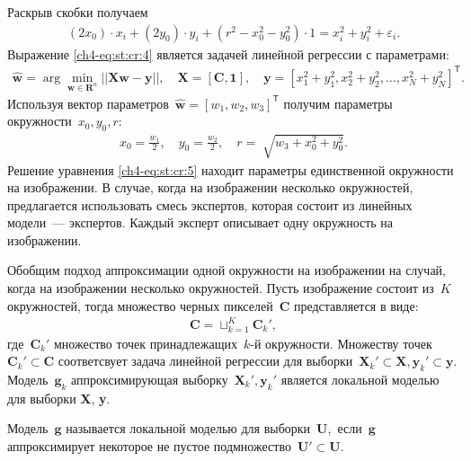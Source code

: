 Раскрыв скобки получаем
\[
\label{ch4-eq:st:cr:4}
\begin{aligned}
\left(2x_0\right)\cdot x_i + \left(2y_0\right)\cdot y_i+\left(r^2-x_0^2-y_0^2\right)\cdot1 = x_{i}^2 + y_{i}^2 + \varepsilon_i.
\end{aligned}
\]
Выражение \eqref{ch4-eq:st:cr:4} является задачей линейной регрессии с параметрами:
\[
\label{ch4-eq:st:cr:5}
\begin{aligned}
\hat{\textbf{w}} = \arg\min_{\textbf{w}\in \mathbf{R}^{n}}||\textbf{X}\textbf{w} - \textbf{y}||,  \quad \textbf{X} = \left[\textbf{C}, \textbf{1}\right], \quad \textbf{y} = \left[x_1^2+y_1^2, x_2^2+y_2^2, \ldots, x_N^2+y_N^2\right]^{\mathsf{T}}.
\end{aligned}
\]
Используя вектор параметров~$\hat{\textbf{w}} = \left[w_1, w_2, w_3\right]^{\mathsf{T}}$ получим параметры окружности~$x_0, y_0, r$:
\[
\label{ch4-eq:st:cr:6}
\begin{aligned}
x_0 = \frac{w_1}{2}, \quad y_0 = \frac{w_2}{2}, \quad r = \sqrt[]{w_3+x_{0}^{2}+y_{0}^{2}}.
\end{aligned}
\]
Решение уравнения \eqref{ch4-eq:st:cr:5} находит параметры единственной окружности на изображении. В случае, когда на изображении несколько окружностей, предлагается использовать смесь экспертов, которая состоит из линейных модели~--- экспертов. Каждый эксперт описывает одну окружность на изображении.

Обобщим подход аппроксимации одной окружности на изображении на случай, когда на изображении несколько окружностей. Пусть изображение состоит из~$K$ окружностей, тогда множество черных пикселей~$\textbf{C}$ представляется в виде:
\[
\label{ch4-eq:st:1}
\begin{aligned}
\textbf{C} = \sqcup_{k=1}^{K}\textbf{C}_{k}',
\end{aligned}
\]
где~$\textbf{C}_{k}'$ множество точек принадлежащих~$k$-й окружности. Множеству точек~$\textbf{C}_{k}' \subset\textbf{C}$ соответсвует задача линейной регрессии для выборки~$\textbf{X}_{k}' \subset \textbf{X}, \textbf{y}_{k}' \subset \textbf{y}$. Модель~$\mathbf{g}_k$ аппроксимирующая выборку~$\textbf{X}_{k}', \textbf{y}_{k}'$ является локальной моделью для выборки \textbf{X}, \textbf{y}.


\begin{definition}
\label{def:1}
Модель~$\mathbf{g}$ называется локальной моделью для выборки~$\textbf{U},$ если~$\mathbf{g}$ аппроксимирует некоторое не пустое подмножество~$\textbf{U}'\subset\textbf{U}$.
\end{definition}

